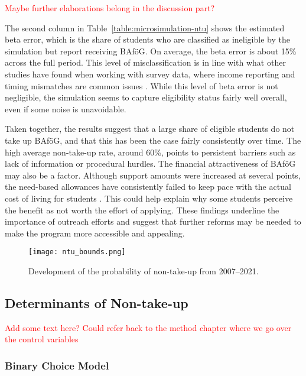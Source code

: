 \textcolor{red}{Maybe further elaborations belong in the discussion part?}

The second column in Table~\ref{table:microsimulation-ntu} shows the estimated beta error, which is the share of students who are classified as ineligible by the simulation but report receiving BAföG. On average, the beta error is about 15\% across the full period. This level of misclassification is in line with what other studies have found when working with survey data, where income reporting and timing mismatches are common issues \citep{frick_claim_2007}. While this level of beta error is not negligible, the simulation seems to capture eligibility status fairly well overall, even if some noise is unavoidable.

Taken together, the results suggest that a large share of eligible students do not take up BAföG, and that this has been the case fairly consistently over time. The high average non-take-up rate, around 60\%, points to persistent barriers such as lack of information or procedural hurdles. The financial attractiveness of BAföG may also be a factor. Although support amounts were increased at several points, the need-based allowances have consistently failed to keep pace with the actual cost of living for students \citep{staack_von_2017}. This could help explain why some students perceive the benefit as not worth the effort of applying. These findings underline the importance of outreach efforts and suggest that further reforms may be needed to make the program more accessible and appealing.




\begin{figure}[htbp]
  \centering
  \texttt{[image: ntu\_bounds.png]}
  \caption{Development of the probability of non-take-up from 2007--2021.}
  \label{fig:ntu_bounds_over_years}
\end{figure}


\subsection{Determinants of Non-take-up}

\textcolor{red}{Add some text here? Could refer back to the method chapter where we go over the control variables}

\subsubsection{Binary Choice Model}

